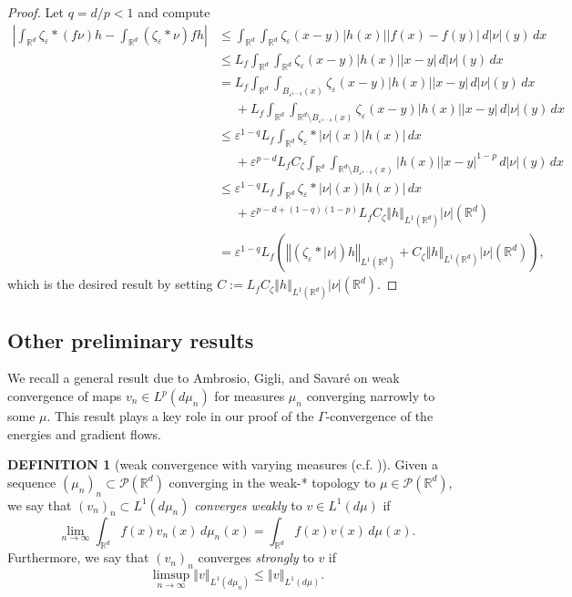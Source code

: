 \documentclass[11pt,leqno]{amsart}
\theoremstyle{definition}
\newtheorem{defi}[thm]{DEFINITION}
\newcommand{\bes}{\begin{equation*}}
\newcommand{\ees}{\end{equation*}}
\newcommand{\norm}[1]{\left\Vert#1\right\Vert}
\newcommand{\R}{{\mathord{\mathbb R}}}
\newcommand{\Rd}{{\mathord{\mathbb R}^d}}
\def\P{{\mathcal P}}
\def\e{\varepsilon}
\newcommand{\ird}{\int_{\mathord{\mathbb R}^d}}
\begin{document}
\begin{proof}
	Let $q = d/p < 1$ and compute
\begin{align*}
	\left| \ird \zeta_\e *(f\nu)h - \ird (\zeta_\e *\nu)fh \right| &\leq \ird \ird \zeta_\e(x-y) |h(x)| |f(x)-f(y)| \,d|\nu|(y) \,dx\\
	&\leq L_f  \ird \ird \zeta_\e(x-y) |h(x)| |x-y| \,d|\nu|(y) \,dx\\
	&= L_f  \ird \int_{B_{\e^{1-q}}(x)} \zeta_\e(x-y) |h(x)| |x-y| \,d|\nu|(y) \,dx\\
	&\phantom{{}={}}+ L_f  \ird \int_{\R^d \setminus B_{\e^{1-q}}(x)} \zeta_\e(x-y) |h(x)| |x-y| \,d|\nu|(y) \,dx\\
	&\leq \e^{1-q} L_f \ird \zeta_\e*|\nu|(x) |h(x)| \,dx\\
	&\phantom{{}={}}+ \e^{p-d} L_f C_\zeta \ird \int_{\R^d \setminus B_{\e^{1-q}}(x)} |h(x)| |x-y|^{1-p} \,d|\nu|(y) \,dx\\ 
	&\leq \e^{1-q} L_f \ird \zeta_\e*|\nu|(x) |h(x)| \,dx\\
	&\phantom{{}={}}+ \e^{p-d + (1-q)(1-p)} L_f C_\zeta \norm{h}_{L^1(\R^d)} |\nu|(\R^d)\\
	&= \e^{1-q} L_f \left( \norm{(\zeta_\e*|\nu|)h}_{L^1(\R^d)} + C_\zeta \norm{h}_{L^1(\R^d)} |\nu|(\R^d) \right),
\end{align*}
which is the desired result by setting $C:= L_f C_\zeta \norm{h}_{L^1(\R^d)} |\nu|(\R^d)$.
\end{proof}


\subsection{Other preliminary results}

We recall a general result due to Ambrosio, Gigli, and Savar\'e on weak convergence of maps $v_n \in L^p(d\mu_n)$ for measures $\mu_n$ converging narrowly to some $\mu$. This result plays a key role in our proof of the $\Gamma$-convergence of the energies and gradient flows.

\begin{defi}[weak convergence with varying measures {(c.f. \cite[Definition 5.4.3]{AGS})}] \label{weakvaryingdef}
Given a sequence $(\mu_n)_n \subset \P(\Rd)$ converging in the weak-* topology to $\mu \in \P(\Rd)$, we say that $(v_n)_n \subset L^1(d \mu_n)$ \emph{converges weakly} to $v \in L^1(d \mu)$ if 
\bes
	\lim_{n\to\infty} \ird f(x) v_n(x) \,d\mu_n(x) = \ird f(x) v(x) \,d\mu(x).
\ees
Furthermore, we say that $(v_n)_n$ converges \emph{strongly} to $v$ if 
\bes
	\limsup_{n\to\infty} \norm{v}_{L^1(d\mu_n)} \leq \norm{v}_{L^1(d\mu)}.
\ees
\end{defi}
\end{document}
